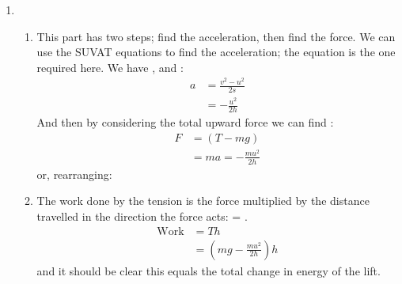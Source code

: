\begin{problem}[HE+_Lift]
{\begin{enumerate}
\begin{enumerate}
\begin{eqnarray*}
F &= (mg - T) \\ 
&= ma = -\frac{mu^{2}}{2h} 
\end{eqnarray*}
or, rearranging 
	\item The work done by the tension is the force multiplied by the distance travelled in the direction the force acts:  =  (as the tension acts in the opposite direction to the distance).
	\begin{eqnarray*} 
	\text{Work} &= -Th \\
	&= -\left(mg + \frac{mu^{2}}{2h}\right)h
	\end{eqnarray*}
and it should be clear this equals the total change in energy of the lift.
\end{enumerate}
\item 
\begin{enumerate} 
\item This part has two steps; find the acceleration, then find the force. We can use the SUVAT equations to find the acceleration; the equation  is the one required here. We have ,  and :
\begin{eqnarray*} 
a &= \frac{v^{2} - u^{2}}{2s} \\ 
&= -\frac{u^{2}}{2h} 
\end{eqnarray*}
And then by considering the total upward force we can find :
\begin{eqnarray*} 
F &= (T - mg) \\ 
&= ma = -\frac{mu^{2}}{2h} 
\end{eqnarray*}
or, rearranging:
	\item The work done by the tension is the force multiplied by the distance travelled in the direction the force acts:  = .
	\begin{eqnarray*} 
	\text{Work} &= Th \\
	&= \left(mg - \frac{mu^{2}}{2h}\right)h 
	\end{eqnarray*}
and it should be clear this equals the total change in energy of the lift. 
\end{enumerate}
\end{enumerate}}
\end{problem}